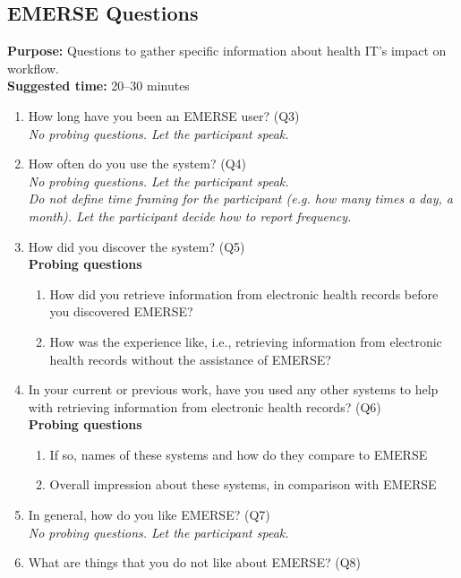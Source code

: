 \subsection{EMERSE Questions}
\textbf{Purpose:} Questions to gather specific information about health IT’s impact on workflow.\\
\textbf{Suggested time:} 20–30 minutes
\begin{enumerate}
    \item How long have you been an EMERSE user? (Q3)\\
        \textit{No probing questions. Let the participant speak.}
    \item How often do you use the system? (Q4)\\
        \textit{No probing questions. Let the participant speak.\\
        Do not define time framing for the participant (e.g. how many times a day, a month). Let the participant decide how to report frequency.}
    \item How did you discover the system? (Q5)\\
        \textbf{Probing questions}
            \begin{enumerate}
                \item How did you retrieve information from electronic health records before you discovered EMERSE?
                \item How was the experience like, i.e., retrieving information from electronic health records without the assistance of EMERSE?
            \end{enumerate}
    \item In your current or previous work, have you used any other systems to help with retrieving information from electronic health records? (Q6)\\
        \textbf{Probing questions}
            \begin{enumerate}
                \item If so, names of these systems and how do they compare to EMERSE
                \item Overall impression about these systems, in comparison with EMERSE
            \end{enumerate}
    \item In general, how do you like EMERSE? (Q7) \\
        \textit{No probing questions. Let the participant speak.}
    \item What are things that you do not like about EMERSE? (Q8) \\

\end{enumerate}
